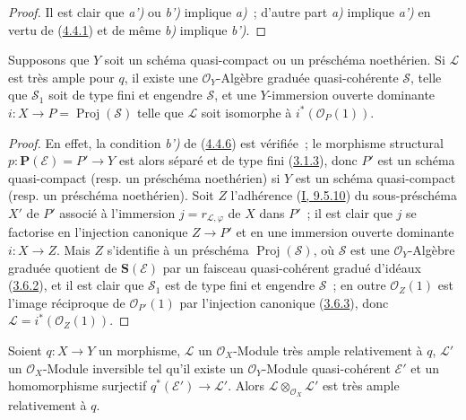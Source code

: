 \begin{proof}
Il est clair que \emph{a')} ou \emph{b')} implique \emph{a)}~; d'autre part \emph{a)} implique \emph{a')} en
vertu de (\hyperref[II.4.4.1-fr]{4.4.1}) et de même \emph{b)} implique \emph{b')}.
\end{proof}

\begin{corollary}[4.4.7]
\label{II.4.4.7-fr}
Supposons que $Y$ soit un schéma quasi-compact ou un préschéma noethérien. Si
$\mathcal{L}$ est très ample pour $q$, il existe une $\mathcal{O}_Y$-Algèbre
graduée quasi-cohérente $\mathcal{S}$, telle que $\mathcal{S}_1$ soit de type
fini et engendre $\mathcal{S}$, et une $Y$-immersion \textup{ouverte dominante}
$i:X\to P=\operatorname{Proj}(\mathcal{S})$ telle que $\mathcal{L}$ soit
isomorphe à $i^*(\mathcal{O}_P(1))$.
\end{corollary}

\begin{proof}
En effet, la condition \emph{b')} de (\hyperref[II.4.4.6-fr]{4.4.6}) est vérifiée~;
le morphisme structural $p:\mathbf{P}(\mathcal{E})=P'\to Y$ est alors séparé
et de type fini (\hyperref[II.3.1.3-fr]{3.1.3}), donc $P'$ est un schéma
quasi-compact (resp. un préschéma noethérien) si $Y$ est un schéma
quasi-compact (resp. un préschéma noethérien). Soit $Z$ l'adhérence
(\hyperref[I.9.5.10-fr]{I, 9.5.10}) du sous-préschéma $X'$ de $P'$ associé à
l'immersion $j=r_{\mathcal{L},\varphi}$ de $X$ dans $P'$~; il est clair que
$j$ se factorise en l'injection canonique $Z\to P'$ et en une immersion
ouverte dominante $i:X\to Z$. Mais $Z$ s'identifie à un préschéma
$\operatorname{Proj}(\mathcal{S})$, où $\mathcal{S}$ est une
$\mathcal{O}_Y$-Algèbre graduée quotient de $\mathbf{S}(\mathcal{E})$ par un
faisceau quasi-cohérent gradué d'idéaux
(\hyperref[II.3.6.2-fr]{3.6.2}), et il est clair que $\mathcal{S}_1$ est de
type fini et engendre $\mathcal{S}$~; en outre $\mathcal{O}_Z(1)$ est l'image
réciproque de $\mathcal{O}_{P'}(1)$ par l'injection canonique
(\hyperref[II.3.6.3-fr]{3.6.3}), donc
$\mathcal{L}=i^*(\mathcal{O}_Z(1))$.
\end{proof}

\begin{proposition}[4.4.8]
\label{II.4.4.8-fr}
Soient $q:X\to Y$ un morphisme, $\mathcal{L}$ un $\mathcal{O}_X$-Module très
ample relativement à $q$, $\mathcal{L}'$ un $\mathcal{O}_X$-Module inversible
tel qu'il existe un $\mathcal{O}_Y$-Module quasi-cohérent $\mathcal{E}'$ et un
homomorphisme surjectif $q^*(\mathcal{E}')\to\mathcal{L}'$. Alors
$\mathcal{L}\otimes_{\mathcal{O}_X}\mathcal{L}'$ est très ample relativement
à $q$.
\end{proposition}

